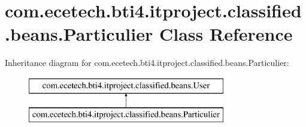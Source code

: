 \hypertarget{classcom_1_1ecetech_1_1bti4_1_1itproject_1_1classified_1_1beans_1_1_particulier}{}\section{com.\+ecetech.\+bti4.\+itproject.\+classified.\+beans.\+Particulier Class Reference}
\label{classcom_1_1ecetech_1_1bti4_1_1itproject_1_1classified_1_1beans_1_1_particulier}
Inheritance diagram for com.\+ecetech.\+bti4.\+itproject.\+classified.\+beans.\+Particulier\+:\begin{figure}[H]
\begin{center}
\leavevmode
\includegraphics[height=2.000000cm]{classcom_1_1ecetech_1_1bti4_1_1itproject_1_1classified_1_1beans_1_1_particulier}
\end{center}
\end{figure}
